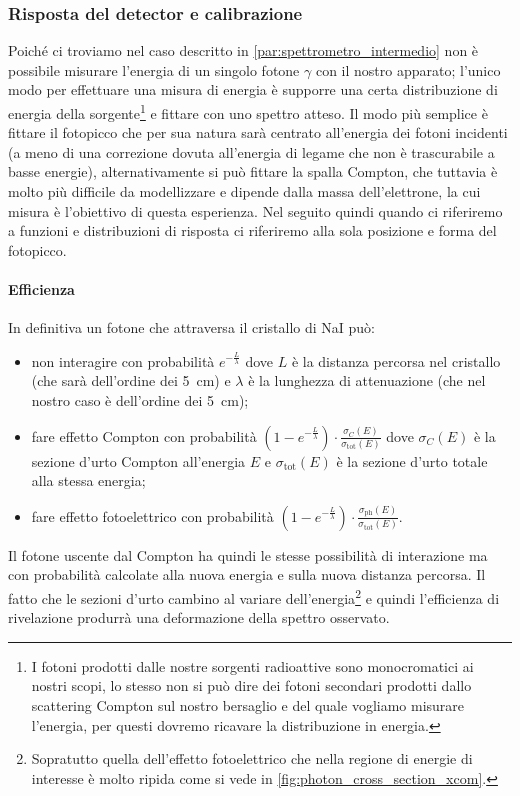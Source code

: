 \subsubsection{Risposta del detector e calibrazione}
 Poiché ci troviamo nel caso descritto in \autoref{par:spettrometro_intermedio} non è possibile misurare l'energia di un singolo fotone $\gamma$ con il nostro apparato; l'unico modo per effettuare una misura di energia è supporre una certa distribuzione di energia della sorgente\footnote{I fotoni prodotti dalle nostre sorgenti radioattive sono monocromatici ai nostri scopi, lo stesso non si può dire dei fotoni secondari prodotti dallo scattering Compton sul nostro bersaglio e del quale vogliamo misurare l'energia, per questi dovremo ricavare la distribuzione in energia.} e fittare con uno spettro atteso.
 Il modo più semplice è fittare il fotopicco che per sua natura sarà centrato all'energia dei fotoni incidenti (a meno di una correzione dovuta all'energia di legame che non è trascurabile a basse energie), alternativamente si può fittare la spalla Compton, che tuttavia è molto più difficile da modellizzare e dipende dalla massa dell'elettrone, la cui misura è l'obiettivo di questa esperienza. Nel seguito quindi quando ci riferiremo a funzioni e distribuzioni di risposta ci riferiremo alla sola posizione e forma del fotopicco.

 \paragraph{Efficienza}
 In definitiva un fotone che attraversa il cristallo di NaI può: 
 \begin{itemize}
 	\item non interagire con probabilità $e^{-\frac{L}{\lambda}}$ dove $L$ è la distanza percorsa nel cristallo (che sarà dell'ordine dei \SI{5}{cm}) e $\lambda$ è la lunghezza di attenuazione (che nel nostro caso è dell'ordine dei \SI{5}{cm});
 	\item fare effetto Compton con probabilità $(1-e^{-\frac{L}{\lambda}})\cdot \frac{\sigma_{C}(E)}{\sigma_\text{tot}(E)}$ dove $\sigma_{C}(E)$ è la sezione d'urto Compton all'energia $E$ e $\sigma_\text{tot}(E)$ è la sezione d'urto totale alla stessa energia;
 	\item fare effetto fotoelettrico con probabilità $(1-e^{-\frac{L}{\lambda}})\cdot \frac{\sigma_\text{ph}(E)}{\sigma_\text{tot}(E)}$.
 \end{itemize}
 Il fotone uscente dal Compton ha quindi le stesse possibilità di interazione ma con probabilità calcolate alla nuova energia e sulla nuova distanza percorsa.
 Il fatto che le sezioni d'urto cambino al variare dell'energia\footnote{Sopratutto quella dell'effetto fotoelettrico che nella regione di energie di interesse è molto ripida come si vede in \autoref{fig:photon_cross_section_xcom}.} e quindi l'efficienza di rivelazione produrrà una deformazione della spettro osservato.
 
